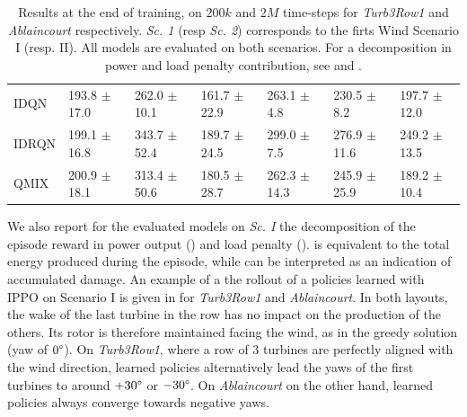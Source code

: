 \documentclass{article}
\begin{document}
\begin{table}[!htb]
\begin{tabular}{lllllll}
IDQN & 193.8 $\pm$ 17.0 & 262.0 $\pm$ 10.1 & 161.7 $\pm$ 22.9 & 263.1 $\pm$ 4.8 & 230.5 $\pm$ 8.2 & 197.7 $\pm$ 12.0 \\
IDRQN & 199.1 $\pm$ 16.8 & 343.7 $\pm$ 52.4 & 189.7 $\pm$ 24.5 & 299.0 $\pm$ 7.5 & 276.9 $\pm$ 11.6 & 249.2 $\pm$ 13.5 \\
QMIX & 200.9 $\pm$ 18.1 & 313.4 $\pm$ 50.6 & 180.5 $\pm$ 28.7 & 262.3 $\pm$ 14.3 & 245.9 $\pm$ 25.9 & 189.2 $\pm$ 10.4
\end{tabular}
\caption{Results at the end of training, on $200k$ and $2M$ time-steps for \textit{Turb3Row1} and \textit{Ablaincourt} respectively. \textit{Sc. 1} (resp \textit{Sc. 2}) corresponds to the firts Wind Scenario I (resp. II). All models are evaluated on both scenarios. For a decomposition in power and load penalty contribution, see  and .} \label{tab:train_scores}
\end{table} 

We also report for the evaluated models on \textit{Sc. I} the decomposition of the episode reward in power output () and load penalty ().  is equivalent to the total energy produced during the episode, while  can be interpreted as an indication of accumulated damage. An example of a the rollout of a policies learned with IPPO on Scenario I is given in  for \textit{Turb3Row1} and \textit{Ablaincourt}. In both layouts, the wake of the last turbine in the row has no impact on the production of the others. Its rotor is therefore maintained facing the wind, as in the greedy solution (yaw of $0\degree$). On \textit{Turb3Row1}, where a row of $3$ turbines are perfectly aligned with the wind direction, learned policies alternatively lead the yaws of the first turbines to around $+30\degree$ or $-30\degree$. On \textit{Ablaincourt} on the other hand, learned policies always converge towards negative yaws.
 
\end{document}
